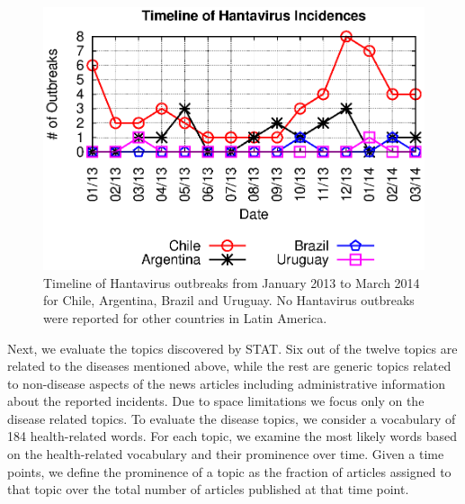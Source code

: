 \documentclass[conference]{IEEEtran}
\newcommand{\model}{{STAT}\xspace} %
\begin{document}
\begin{figure}[h]
\begin{center}
	\includegraphics[trim=0 0 0 0, clip,scale=0.5]{fig/hanta_outbreaks_timeline.eps}
\end{center}
\caption{Timeline of Hantavirus outbreaks from January 2013 to March 2014 for Chile, Argentina, Brazil and Uruguay. No Hantavirus outbreaks were reported for other countries in Latin America.}
 \label{fig:hanta_timeline}
\end{figure}

Next, we evaluate the topics discovered by \model. Six out of the twelve topics are related to the diseases mentioned above, while the rest are generic topics related to non-disease aspects of the news articles including administrative information about the reported incidents. Due to space limitations we focus only on the disease related topics. To evaluate the disease topics, we consider a vocabulary of 184 health-related words. For each topic, we examine the most likely words based on the health-related vocabulary and their prominence over time. Given a time points, we define the prominence of a topic as the fraction of articles assigned to that topic over the total number of articles published at that time point.
\end{document}
